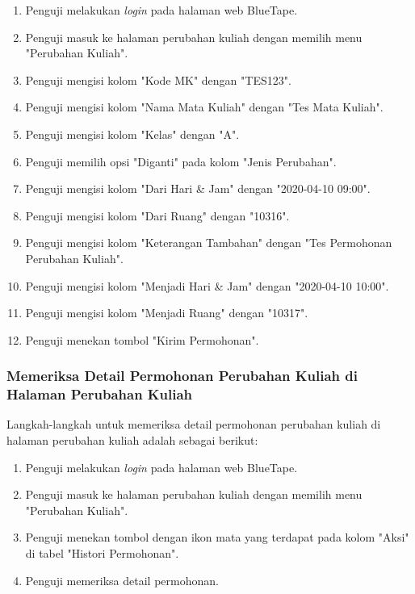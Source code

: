\begin{enumerate}
    \item Penguji melakukan \textit{login} pada halaman web BlueTape.
    \item Penguji masuk ke halaman perubahan kuliah dengan memilih menu "Perubahan Kuliah".
    \item Penguji mengisi kolom "Kode MK" dengan "TES123".
    \item Penguji mengisi kolom "Nama Mata Kuliah" dengan "Tes Mata Kuliah".
    \item Penguji mengisi kolom "Kelas" dengan "A".
    \item Penguji memilih opsi "Diganti" pada kolom "Jenis Perubahan".
    \item Penguji mengisi kolom "Dari Hari \& Jam" dengan "2020-04-10 09:00".
    \item Penguji mengisi kolom "Dari Ruang" dengan "10316".
    \item Penguji mengisi kolom "Keterangan Tambahan" dengan "Tes Permohonan Perubahan Kuliah".
    \item Penguji mengisi kolom "Menjadi Hari \& Jam" dengan "2020-04-10 10:00".
    \item Penguji mengisi kolom "Menjadi Ruang" dengan "10317".
    \item Penguji menekan tombol "Kirim Permohonan".
\end{enumerate}

\subsubsection{Memeriksa Detail Permohonan Perubahan Kuliah di Halaman Perubahan Kuliah}
\label{subsubsec:skenario_memeriksa_detail_permohonan_perubahan_kuliah_di_halaman_perubahan_kuliah}
Langkah-langkah untuk memeriksa detail permohonan perubahan kuliah di halaman perubahan kuliah adalah sebagai berikut:

\begin{enumerate}
    \item Penguji melakukan \textit{login} pada halaman web BlueTape.
    \item Penguji masuk ke halaman perubahan kuliah dengan memilih menu "Perubahan Kuliah".
    \item Penguji menekan tombol dengan ikon mata yang terdapat pada kolom "Aksi" di tabel "Histori Permohonan".
    \item Penguji memeriksa detail permohonan.
\end{enumerate}

